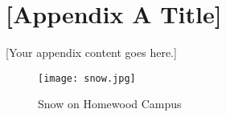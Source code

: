 \chapter{[Appendix A Title]}
\label{app:appendix1}

[Your appendix content goes here.]

\begin{figure}[h]
    \centering
    \texttt{[image: snow.jpg]}
    \caption{Snow on Homewood Campus}
    \label{fig:snow}
\end{figure}
